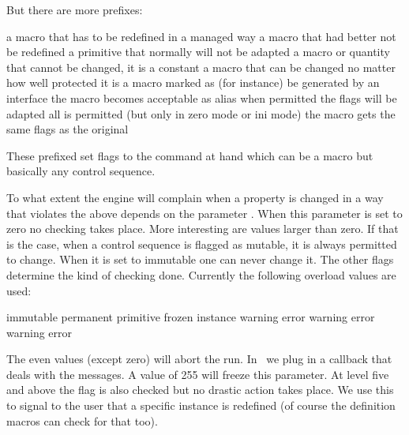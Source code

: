 But there are more prefixes:

\starttabulate
\HL
\NC {}     \NC a macro that has to be redefined in a managed way \NC \NR
\NC {}  \NC a macro that had better not be redefined \NC \NR
\NC {}  \NC a primitive that normally will not be adapted \NC \NR
\NC {}  \NC a macro or quantity that cannot be changed, it is a constant \NC \NR
\NC {}    \NC a macro that can be changed no matter how well protected it is \NC \NR
\HL
\NC {}   \NC a macro marked as (for instance) be generated by an interface \NC \NR
\HL
\NC {}  \NC the macro becomes acceptable as \type {\noalign} alias \NC \NR
\HL
\NC {} \NC when permitted the flags will be adapted \NC \NR
\NC {}   \NC all is permitted (but only in zero mode or ini mode) \NC \NR
\NC {}    \NC the macro gets the same flags as the original \NC \NR
\HL
\stoptabulate

These prefixed set flags to the command at hand which can be a macro but
basically any control sequence.

To what extent the engine will complain when a property is changed in a way that
violates the above depends on the parameter \type {\overloadmode}. When this
parameter is set to zero no checking takes place. More interesting are values
larger than zero. If that is the case, when a control sequence is flagged as
mutable, it is always permitted to change. When it is set to immutable one can
never change it. The other flags determine the kind of checking done. Currently
the following overload values are used:

\starttabulate[|l|l|c|c|c|c|c|]
    \NC   \NC         \BC immutable \BC permanent \BC primitive \BC frozen \BC instance \NC \NR
     \NC warning \NC \star     \NC \star     \NC \star     \NC        \NC          \NC \NR
     \NC error   \NC \star     \NC \star     \NC \star     \NC        \NC          \NC \NR
     \NC warning \NC \star     \NC \star     \NC \star     \NC \star  \NC          \NC \NR
     \NC error   \NC \star     \NC \star     \NC \star     \NC \star  \NC          \NC \NR
     \NC warning \NC \star     \NC \star     \NC \star     \NC \star  \NC \star    \NC \NR
     \NC error   \NC \star     \NC \star     \NC \star     \NC \star  \NC \star    \NC \NR
\stoptabulate

The even values (except zero) will abort the run. In \CONTEXT\ we plug in a
callback that deals with the messages. A value of 255 will freeze this parameter.
At level five and above the  flag is also checked but no drastic
action takes place. We use this to signal to the user that a specific instance is
redefined (of course the definition macros can check for that too).

